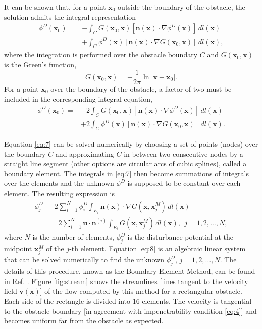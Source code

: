 \documentclass[11pt]{article}
\begin{document}
It can be shown \cite{pozrikidis2002practical} that, for a point $\mathbf{x}_0$ outside the boundary of the obstacle, the solution admits the integral representation
\begin{align}
\phi^{D}(\mathbf{x}_0) = 
& - \int_{C} G(\mathbf{x}_0, \mathbf{x}) 
\left[ \mathbf{n}(\mathbf{x}) \cdot \nabla \phi^{D}(\mathbf{x}) \right] \, dl(\mathbf{x}) \nonumber \\
& + \int_{C} \phi^{D}(\mathbf{x}) 
\left[ \mathbf{n}(\mathbf{x}) \cdot \nabla G(\mathbf{x}_0, \mathbf{x}) \right] \, dl(\mathbf{x}) ,\label{eq:6}
\end{align}
where the integration is performed over the obstacle boundary $C$ and $G(\mathbf{x}_0,\mathbf{x})$ is the Green's function,
  \begin{equation}
    \label{eq:7}
   G(\mathbf{x}_0,\mathbf{x}) = -\frac{1}{2\pi}\ln{|\mathbf{x}-\mathbf{x}_0|}.
  \end{equation}
  For a point $\mathbf{x}_0$ over the boundary of the obstacle, a factor of two must be included in the corresponding integral equation,
  \begin{align}
\phi^{D}(\mathbf{x}_0) = 
& - 2\int_{C} G(\mathbf{x}_0, \mathbf{x}) 
\left[ \mathbf{n}(\mathbf{x}) \cdot \nabla \phi^{D}(\mathbf{x}) \right] \, dl(\mathbf{x}) \nonumber \\
& + 2\int_{C} \phi^{D}(\mathbf{x}) 
\left[ \mathbf{n}(\mathbf{x}) \cdot \nabla G(\mathbf{x}_0, \mathbf{x}) \right] \, dl(\mathbf{x})\label{eq:7}.  \end{align}

Equation \eqref{eq:7} can be solved numerically by choosing a set of points (nodes) over the boundary $C$ and approximating $C$ in between two consecutive nodes by a straight line segment (other options are circular arcs of cubic splines), called a boundary element. The integrals in \eqref{eq:7} then become summations of integrals over the elements and the unknown $\phi^D$ is supposed to be constant over each element. The resulting expression is
\begin{align}
\phi^{D}_{j} 
&- 2 \sum_{i=1}^{N} \phi^{D}_{i} 
   \int_{E_i} \mathbf{n}(\mathbf{x}) \cdot \nabla G(\mathbf{x}, \mathbf{x}^{M}_{j}) \, dl(\mathbf{x}) \nonumber \\
&= 2 \sum_{i=1}^{N} 
   \mathbf{u} \cdot \mathbf{n}^{(i)} 
   \int_{E_i} G(\mathbf{x}, \mathbf{x}^{M}_{j}) \, dl(\mathbf{x}) ,~~j=1,2,\ldots,N,\label{eq:8}
\end{align}
where $N$ is the number of elements, $\phi^D_j$ is the disturbance potential at the midpoint $\mathbf{x}^M_j$ of the $j$-th element. Equation \eqref{eq:8} is an algebraic linear system that can be solved numerically to find the unknown $\phi^D_j$, $j=1,2,\ldots,N$. The details of this procedure, known as the Boundary Element Method, can be found in Ref. \cite{pozrikidis2002practical}. Figure \ref{fig:stream} shows the streamlines [lines tangent to the velocity field $\mathbf{v}(\mathbf{x})$] of the flow computed by this method for a rectangular obstacle. Each side of the rectangle is divided into 16 elements. The velocity is tangential to the obstacle boundary [in agreement with impenetrability condition \ref{eq:4}] and becomes uniform far from the obstacle as expected.
\end{document}
